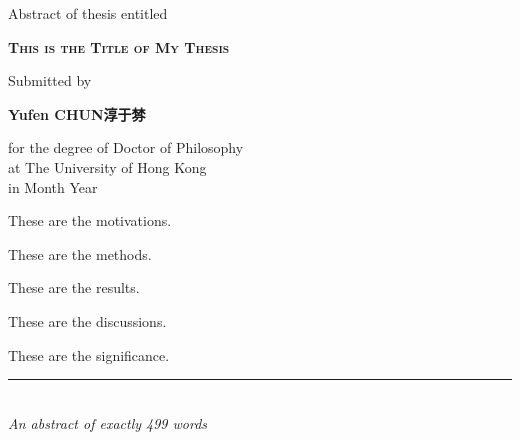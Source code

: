 

%
%
\begin{titlepage}
	\begin{center}
	
	Abstract of thesis entitled\\
	
	 \bigskip 
	   	
        \huge\textsc{\textbf{This is the Title of My Thesis}} \\
            
        \bigskip
        	
        {\normalsize Submitted by}\\
			
	\bigskip  	
        
        \Large{\textbf{Yufen CHUN}}\textbf{淳于棼}\\
       
	\bigskip
	       
	{\normalsize
	for the degree of Doctor of Philosophy\\
	at The University of Hong Kong\\
	in Month Year\\}
        
        \end{center}    
	
	\bigskip
	
	These are the motivations. \lipsum[1]
	
	These are the methods. \lipsum[1]
	
	These are the results. \lipsum[1]
	
	These are the discussions. \lipsum[1]
	
	These are the significance. \lipsum[1]
	
	\bigskip
	
	\begin{center}
	
	\rule{6cm}{0.025cm}\\
	{\slshape An abstract of exactly 499 words}
	
	\end{center}  
\end{titlepage}   
